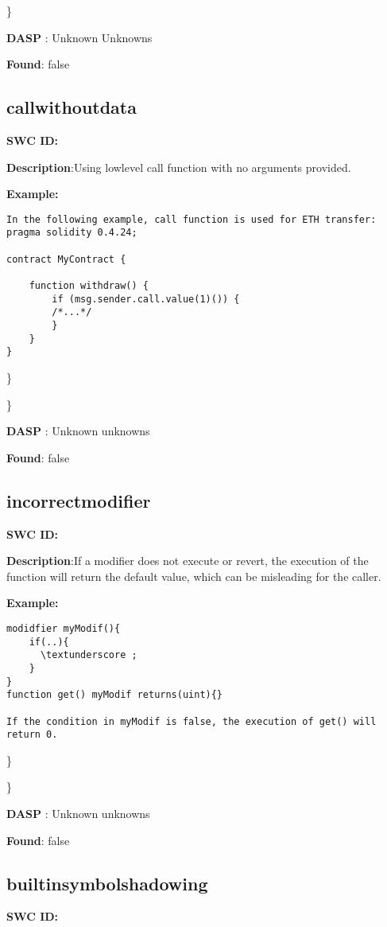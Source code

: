 \documentclass{article}
\begin{document}
\} 

\textbf{DASP} : Unknown Unknowns

\textbf{Found}: false

\subsection{call\textunderscore without\textunderscore data} 
\textbf{SWC \textunderscore ID:} 

\textbf{Description}:Using low\textendash level call function with no arguments provided.


\textbf{Example:} 
\begin{verbatim}
In the following example, call function is used for ETH transfer:
pragma solidity 0.4.24;

contract MyContract {

    function withdraw() {
        if (msg.sender.call.value(1)()) {
        /*...*/
        }
    }
}

\end{verbatim}\} 

\} 

\textbf{DASP} : Unknown unknowns

\textbf{Found}: false

\subsection{incorrect\textunderscore modifier} 
\textbf{SWC \textunderscore ID:} 

\textbf{Description}:If a modifier does not execute \textunderscore  or revert, the execution of the function will return the default value, which can be misleading for the caller.


\textbf{Example:} 
\begin{verbatim}
modidfier myModif(){
    if(..){
      \textunderscore ;
    }
}
function get() myModif returns(uint){}

If the condition in myModif is false, the execution of get() will return 0.

\end{verbatim}\} 

\} 

\textbf{DASP} : Unknown unknowns

\textbf{Found}: false

\subsection{builtin\textunderscore symbol\textunderscore shadowing} 
\textbf{SWC \textunderscore ID:} 
\end{document}

